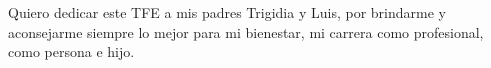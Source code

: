 {
\slshape

Quiero dedicar este \acl{TFE} a mis padres Trigidia y Luis, por brindarme y aconsejarme siempre lo mejor para mi bienestar, mi carrera como profesional, como persona e hijo.

}
